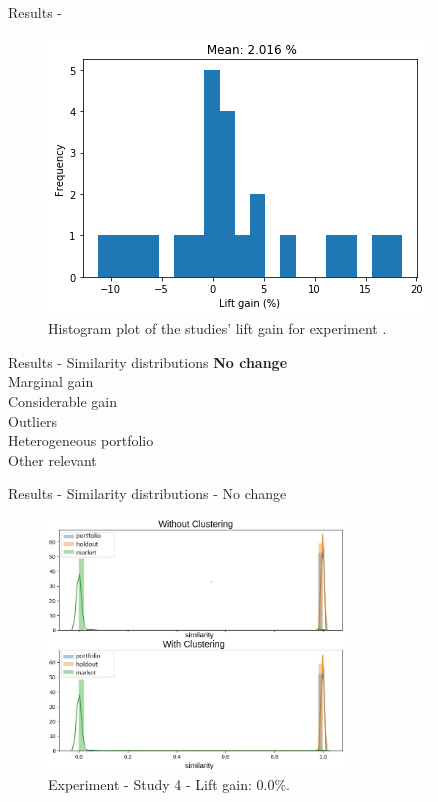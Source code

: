 \begin{frame}{Results - \fullNameExperimentII{}}
    \begin{figure}
       \centering
       \includegraphics[width=.8\linewidth]{fig/ch4-lift-hist-plot-exp-ii.png}
       \caption{Histogram plot of the studies' lift gain for experiment \nameExperimentII{}.}
       \label{fig:lift-hist-plot-exp-ii}
    \end{figure}
\end{frame}


\begin{frame}{Results - Similarity distributions} \pause
    \textbf<8->{No change} \\  \pause
    \vspace{0.5cm}
    Marginal gain \\ \pause
    \vspace{0.5cm}
    Considerable gain \\ \pause
    \vspace{0.5cm}
    Outliers \\ \pause
    \vspace{0.5cm}
    Heterogeneous portfolio \\ \pause
    \vspace{0.5cm}
    Other relevant 
\end{frame}


\begin{frame}{Results - Similarity distributions - No change}
    \begin{figure}
       \centering
       \includegraphics[width=8cm]{fig/ch4-study-4-comparsion-exp-i.png}
       \caption{Experiment \nameExperimentI{} - Study 4 - Lift gain: \colorbox{white}{0.0\%.}}
    \end{figure}
\end{frame}


